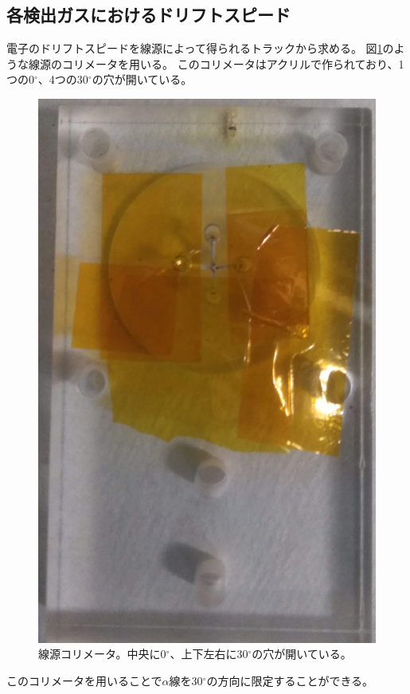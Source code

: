 \subsection{各検出ガスにおけるドリフトスピード}
電子のドリフトスピードを線源によって得られるトラックから求める。
図\ref{pic::collimator}のような線源のコリメータを用いる。
このコリメータはアクリルで作られており、1つの0${}^{\circ}$、4つの30${}^{\circ}$の穴が開いている。
\begin{figure}
  \centering
  \includegraphics[clip, height=0.7\columnwidth, angle=90]{pic/IMG_20191023_145443_trmd.jpg}
  \caption[線源コリメータ。]
          {線源コリメータ。中央に0${}^{\circ}$、上下左右に30${}^{\circ}$の穴が開いている。}
  \label{pic::collimator}  
\end{figure}
このコリメータを用いることで$\alpha$線を30${}^{\circ}$の方向に限定することができる。
